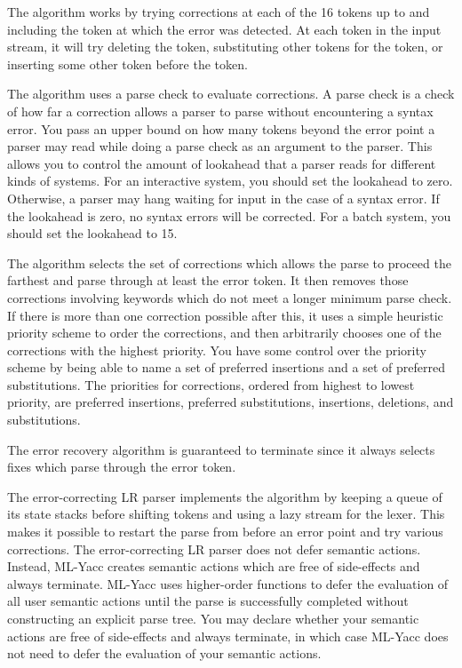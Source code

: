 \documentclass{article}
\begin{document}
The algorithm works by trying corrections at each
of the 16 tokens up to and including the token at which the
error was detected.  At each token in the input stream, it
will try deleting the token, substituting other tokens for the
token, or inserting some other token before the token.

The algorithm uses a parse check to evaluate corrections.  A parse
check is a check of how far a correction allows a parser to
parse without encountering a syntax error.
You pass an upper bound on how many tokens beyond the error
point a parser may read while doing a parse check as an argument to the
parser.  This allows
you to control the amount of lookahead that a parser reads
for different kinds of systems.  For an interactive system, you
should set the lookahead to zero.  Otherwise, a parser may hang
waiting for input in the case of a syntax error.  If the lookahead
is zero, no syntax errors will be corrected.  For a batch system,
you should set the lookahead to 15.

The algorithm selects the set of corrections which allows the parse
to proceed the farthest
and parse through at least the error token.  It then removes those
corrections involving keywords which do not meet a longer minimum
parse check.  If there is more than one correction possible after this,
it uses a simple heuristic priority scheme to order the corrections,
and then arbitrarily chooses one of the corrections with the highest priority.
You have some control over the priority scheme by being able to
name a set of preferred insertions and a set of preferred substitutions.
The priorities for corrections, ordered from highest to lowest
priority, are
preferred insertions, preferred substitutions, insertions, deletions,
and substitutions.

The error recovery algorithm is guaranteed to terminate since it always
selects fixes which parse through the
error token.

The error-correcting LR parser implements the algorithm by keeping
a queue of its state stacks before shifting tokens and using
a lazy stream for the lexer.
This makes it possible to restart the
parse from before an error point and try various corrections.  The
error-correcting LR parser does not defer semantic actions.  Instead,
ML-Yacc creates semantic actions which are free of side-effects
and always terminate.
ML-Yacc uses higher-order functions to defer the
evaluation of all user semantic actions until the parse is successfully
completed without constructing an explicit parse tree.
You may declare whether your semantic actions are free of side-effects
and always terminate, in which case ML-Yacc does not need to defer
the evaluation of your semantic actions.
\end{document}
